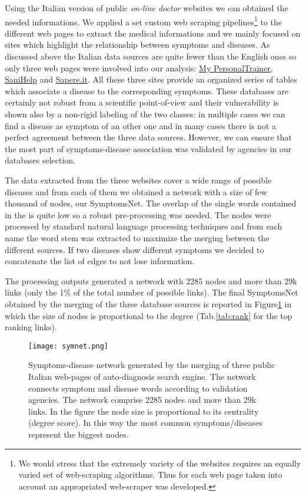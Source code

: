 \documentclass{standalone}
\begin{document}
Using the Italian version of public \emph{on-line doctor} websites we can obtained the needed informations.
We applied a set custom web scraping pipelines\footnote{
  We would stress that the extremely variety of the websites requires an equally varied set of web-scraping algorithms.
  Thus for each web page taken into account an appropriated web-scraper was developed.
} to the different web pages to extract the medical informations and we mainly focused on sites which highlight the relationship between symptoms and diseases.
As discussed above the Italian data sources are quite fewer than the English ones so only three web pages were involved into our analysis: \href{https://m.my-personaltrainer.it/}{My PersonalTrainer}, \href{http://www.sanihelp.it/}{SaniHelp} and \href{http://www.sapere.it/}{Sapere.it}.
All these three sites provide an organized series of tables which associate a disease to the corresponding symptoms.
These databases are certainly not robust from a scientific point-of-view and their vulnerability is shown also by a non-rigid labeling of the two classes: in multiple cases we can find a disease as symptom of an other one and in many cases there is not a perfect agreement between the three data sources.
However, we can ensure that the most part of symptoms-disease association was validated by  agencies in our databases selection.

The data extracted from the three websites cover a wide range of possible diseases and from each of them we obtained a network with a size of few thousand of nodes, our SymptomsNet.
The overlap of the single words contained in the  is quite low so a robust pre-processing was needed.
The nodes were processed by standard natural language processing techniques and from each name the word stem was extracted to maximize the merging between the different sources.
If two diseases show different symptoms we decided to concatenate the list of edges to not lose information.

The processing outputs generated a network with 2285 nodes and more than 29k links (only the 1\% of the total number of possible links).
The final SymptomsNet obtained by the merging of the three database sources is reported in Figure\ref{fig:net} in which the size of nodes is proportional to the degree (Tab.\ref{tab:rank} for the top ranking links).

\begin{figure}[htbp]
\centering
\texttt{[image: symnet.png]}
\caption{Symptoms-disease network generated by the merging of three public Italian web-pages of auto-diagnosis search engine.
The network connects symptom and disease words according to validation agencies.
The network comprise 2285 nodes and more than 29k links.
In the figure the node size is proportional to its centrality (degree score).
In this way the most common symptoms/diseases represent the biggest nodes.
}
\label{fig:net}
\end{figure}
\end{document}
